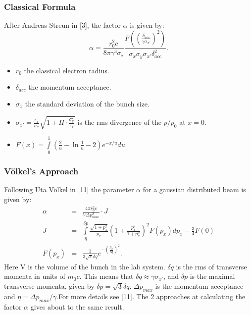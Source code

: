 \subsubsection{Classical Formula}
After Andreas Streun in [3], the factor $\alpha$ is given by:
\begin{equation} \alpha = \frac{r_0 ^2 c}{8 \pi \gamma^3 \sigma_s} \frac{F\left(\left(\frac{\delta_{acc}}{\gamma \sigma_{x'}}\right)^2\right)}{\sigma_x \sigma_y \sigma_{x'} \delta_{acc} ^2}. \end{equation}
  \begin{itemize}
  \item $r_0$ the classical electron radius.
  \item $\delta_{acc}$ the momentum acceptance.
  \item $\sigma_x$ the standard deviation of the bunch size.
  \item $\sigma_{x'} = \frac{\epsilon_x}{\sigma_x} \sqrt{1 + H \cdot \frac{\sigma_{t'} ^2}{\epsilon_x}}$ is the rms divergence of the $p / p_0$ at $x = 0.$
  \item $F(x) = \int\limits_0^1 \left(\frac 2 u - \ln \frac 1 u -2\right) e^{-x / u} du$
  \end{itemize}
\subsubsection{V\"olkel's Approach}  
Following Uta V\"olkel in [11] the parameter $\alpha$ for a gaussian distributed beam is given by:
\begin{eqnarray}
\alpha &=& \frac {4 \pi r_0 ^2 c}{V \Delta p_{max} ^2} \cdot J \\
J &=& \int\limits_\eta^{\delta p} \frac{\sqrt{1 + p_x ^2}}{p_x} \left(1 + \frac{p_x ^2}{1 + p_x ^2}\right)^2 F(p_x) d p_x - \frac 3 4 F(0) \\
F(p_x) &=& \frac{1}{2 \sqrt \pi \delta q} e^{- \left(\frac{p_x}{\delta q}\right)^2}. 
\end{eqnarray}
Here V is the volume of the bunch in the lab system. $\delta q$ is the rms of transverse momenta in units of $m_0 c$. This means that $\delta q \approx \gamma \sigma_{x'}$, and $\delta p$ is the maximal transverse momenta, given by $\delta p = \sqrt{3} \delta q$. $\Delta p_{max}$ is the momentum acceptance and $\eta = \Delta p_{max} / \gamma$.For more details see [11]. The 2 approaches at calculating the factor $\alpha$ gives about to the same result.

